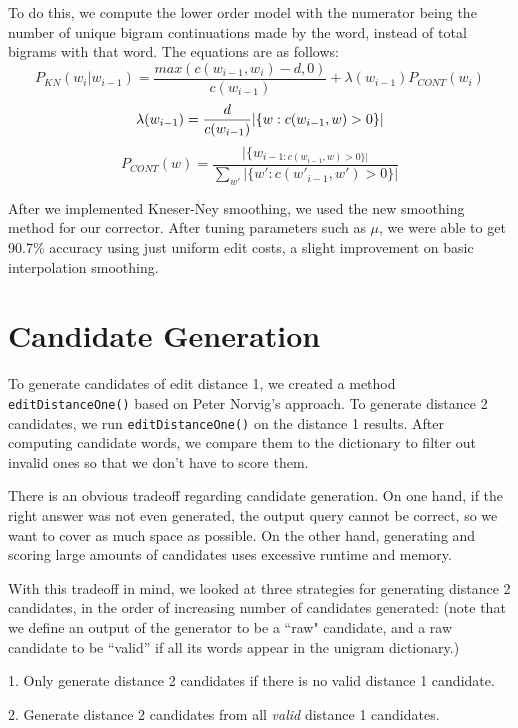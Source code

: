 \documentclass[10pt,twocolumn]{article}
\begin{document}
To do this, we compute the lower order model with the numerator being the number of unique bigram continuations made by the word, instead of total bigrams with that word. The equations are as follows:
\begin{equation*}
P_{KN}(w_i|w_{i-1})=\frac{max(c(w_{i-1},w_i)-d,0)}{c(w_{i-1})}+\lambda(w_{i-1})P_{CONT}(w_i)
\end{equation*}
\begin{equation*}
\lambda(w_{i-1}) = \frac{d}{c(w_{i-1})}|\{w:c(w_{i-1},w)>0\}|\\
\end{equation*}
\begin{equation*}
P_{CONT}(w) = \frac{|\{w_{i-1:c(w_{i-1},w)>0\}|}}{\sum_{w'}|\{w':c(w'_{i-1},w')>0\}|}
\end{equation*}

After we implemented Kneser-Ney smoothing, we used the new smoothing method for our corrector. After tuning parameters such as $\mu$, we were able to get 90.7\% accuracy using just uniform edit costs, a slight improvement on basic interpolation smoothing. 
\section{Candidate Generation}
To generate candidates of edit distance 1, we created a method \texttt{editDistanceOne()} based on Peter Norvig's approach. To generate distance 2 candidates, we run \texttt{editDistanceOne()} on the distance 1 results. After computing candidate words, we compare them to the dictionary to filter out invalid ones so that we don't have to score them.
 
There is an obvious tradeoff regarding candidate generation. On one hand, if the right answer was not even generated, the output query cannot be correct, so we want to cover as much space as possible. On the other hand, generating and scoring large amounts of candidates uses excessive runtime and memory.

With this tradeoff in mind, we looked at three strategies for generating distance 2 candidates, in the order of increasing number of candidates generated: (note that we define an output of the generator to be a ``raw" candidate, and a raw candidate to be ``valid'' if all its words appear in the unigram dictionary.)

1. Only generate distance 2 candidates if there is no valid distance 1 candidate.

2. Generate distance 2 candidates from all {\it valid} distance 1 candidates.
\end{document}
